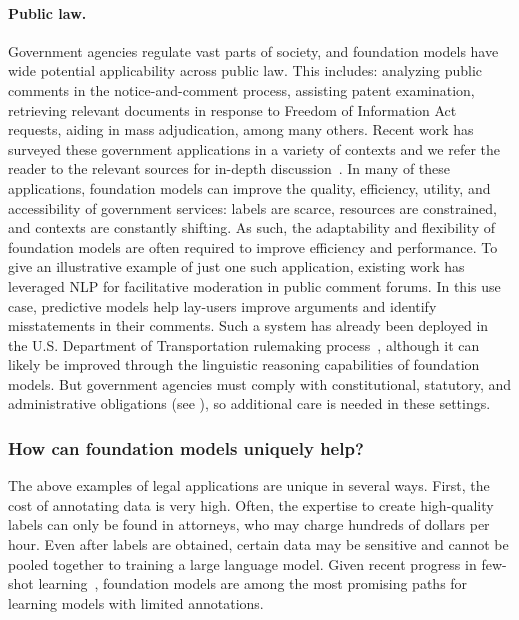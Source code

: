 \paragraph{Public law.} Government agencies regulate vast parts of society, and foundation models have wide potential applicability across public law. This includes: analyzing public comments in the notice-and-comment process, assisting  patent examination, retrieving relevant documents in response to Freedom of Information Act requests, aiding in mass adjudication, among many others. 
Recent work has surveyed these government applications in a variety of contexts and we refer the reader to the relevant sources for in-depth discussion~\citep{engstrom2020government,coglianese2020ai}. 
In many of these applications, foundation models can improve the quality, efficiency, utility, and accessibility of government services: labels are scarce, resources are constrained, and contexts are constantly shifting. As such, the adaptability and flexibility of foundation models are often required to improve efficiency and performance.
To give an illustrative example of just one such application, existing work has leveraged NLP for facilitative moderation in public comment forums. In this use case, predictive models help lay-users improve arguments and identify misstatements in their comments. Such a system has already been deployed in the U.S. Department of Transportation rulemaking process~\citep{park2012facilitative}, although it can likely be improved through the linguistic reasoning capabilities of foundation models.
But government agencies must comply with constitutional, statutory, and administrative obligations (see ), so additional care is needed in these settings. 

\subsubsection{How can foundation models uniquely help?}

The above examples of legal applications are unique in several ways. First, the cost of annotating data is very high. Often, the expertise to create high-quality labels can only be found in attorneys, who may charge hundreds of dollars per hour. %
Even after labels are obtained, certain data may be sensitive and cannot be pooled together to training a large language model.
Given recent progress in few-shot learning~\citep{brown2020gpt3}, foundation models are among the most promising paths for learning models with limited annotations.

